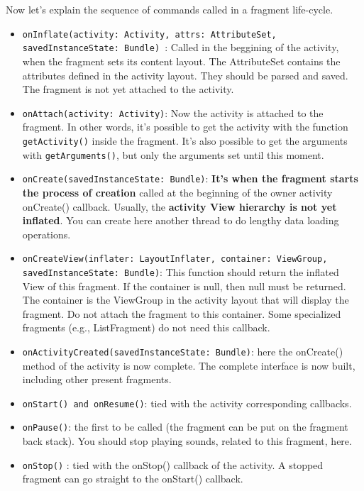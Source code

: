 Now let's explain the sequence of commands called in a fragment life-cycle. 
\begin{itemize}
\item \texttt{onInflate(activity: Activity, attrs: AttributeSet, savedInstanceState: Bundle) }: Called in 
the beggining of the activity, when the fragment sets its content layout. The AttributeSet contains the attributes defined in the activity layout. They should be
parsed and saved. The fragment is not yet attached to the activity.

\item \texttt{onAttach(activity: Activity)}: Now the activity is attached to the fragment. In other words, 
it's possible to get the activity with the function \texttt{getActivity()} inside the fragment. 
It's also possible to get the arguments with \texttt{getArguments()}, but only the arguments set until
this moment.

\item \texttt{onCreate(savedInstanceState: Bundle)}: \textbf{It's when the fragment starts the process 
of creation} called at the beginning of the owner activity onCreate() callback. Usually, the 
\textbf{activity View hierarchy is not yet inflated}. You can create here another thread to do 
lengthy data loading operations.

\item \texttt{onCreateView(inflater: LayoutInflater, container: ViewGroup, savedInstanceState: Bundle)}:
This function should return the inflated View of this fragment. If the container is null, then null
must be returned. The container is the ViewGroup in the activity layout that will display the fragment.
Do not attach the fragment to this container. Some specialized fragments (e.g., ListFragment) do not need 
this callback.

\item \texttt{onActivityCreated(savedInstanceState: Bundle)}: here the onCreate() method of the activity 
is now complete. The complete interface is now built, including other present fragments. 

\item \texttt{onStart() and onResume()}: tied with the activity corresponding callbacks.

\item \texttt{onPause()}: the first to be called (the fragment can be put on the fragment back stack). You
should stop playing sounds, related to this fragment, here.

\item \texttt{onStop()} : tied with the onStop() callback of the activity. A stopped fragment can go straight
to the onStart() callback.


\end{itemize}
